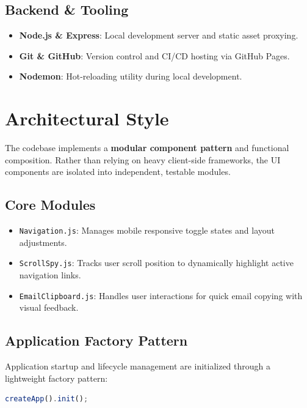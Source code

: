 \documentclass{article}
\begin{document}
\subsection{Backend \& Tooling}
\begin{itemize}
    \item \textbf{Node.js \& Express}: Local development server and static asset proxying.
    \item \textbf{Git \& GitHub}: Version control and CI/CD hosting via GitHub Pages.
    \item \textbf{Nodemon}: Hot-reloading utility during local development.
\end{itemize}

\section{Architectural Style}

The codebase implements a \textbf{modular component pattern} and functional composition. Rather than relying on heavy client-side frameworks, the UI components are isolated into independent, testable modules.

\subsection{Core Modules}
\begin{itemize}
    \item \texttt{Navigation.js}: Manages mobile responsive toggle states and layout adjustments.
    \item \texttt{ScrollSpy.js}: Tracks user scroll position to dynamically highlight active navigation links.
    \item \texttt{EmailClipboard.js}: Handles user interactions for quick email copying with visual feedback.
\end{itemize}

\subsection{Application Factory Pattern}
Application startup and lifecycle management are initialized through a lightweight factory pattern:

\begin{lstlisting}[style=codeblock, language=JavaScript]
createApp().init();
\end{lstlisting}
\end{document}

